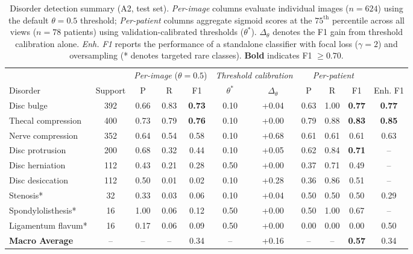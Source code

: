 \documentclass[journal]{IEEEtran}
\begin{document}
\begin{table}[htbp]
\centering
\caption{%
Disorder detection summary (A2, test set). \textit{Per-image} columns evaluate individual images ($n=624$) using the default $\theta=0.5$ threshold; \textit{Per-patient} columns aggregate sigmoid scores at the $75^\text{th}$ percentile across all views ($n=78$ patients) using validation-calibrated thresholds ($\theta^*$). $\Delta_\theta$ denotes the F1 gain from threshold calibration alone. \textit{Enh. F1} reports the performance of a standalone classifier with focal loss ($\gamma=2$) and oversampling (* denotes targeted rare classes). \textbf{Bold} indicates F1 $\geq 0.70$.%
}
\label{tab:disorders}
\begin{tabular*}{\textwidth}{@{\extracolsep{\fill}} l c ccc c c ccc c @{}}
\toprule
& & \multicolumn{3}{c}{\textit{Per-image} ($\theta=0.5$)} 
& \multicolumn{2}{c}{\textit{Threshold calibration}} 
& \multicolumn{3}{c}{\textit{Per-patient}} 
& \\
\cmidrule{3-5} \cmidrule{6-7} \cmidrule{8-10}
Disorder & Support & P & R & F1 & $\theta^*$ & $\Delta_\theta$ & P & R & F1 & Enh. F1 \\
\midrule
Disc bulge & 392 & 0.66 & 0.83 & \textbf{0.73} & 0.10 & +0.04 & 0.63 & 1.00 & \textbf{0.77} & \textbf{0.77} \\
Thecal compression & 400 & 0.73 & 0.79 & \textbf{0.76} & 0.10 & +0.00 & 0.79 & 0.88 & \textbf{0.83} & \textbf{0.85} \\
Nerve compression & 352 & 0.64 & 0.54 & 0.58 & 0.10 & +0.68 & 0.61 & 0.61 & 0.61 & 0.63 \\
Disc protrusion & 200 & 0.68 & 0.32 & 0.44 & 0.10 & +0.05 & 0.62 & 0.84 & \textbf{0.71} & -- \\
Disc herniation & 112 & 0.43 & 0.21 & 0.28 & 0.50 & +0.00 & 0.37 & 0.71 & 0.49 & -- \\
Disc desiccation & 112 & 0.50 & 0.01 & 0.02 & 0.10 & +0.28 & 0.36 & 0.86 & 0.51 & -- \\
Stenosis* & 32 & 0.33 & 0.03 & 0.06 & 0.10 & +0.04 & 0.50 & 0.50 & 0.50 & 0.29 \\
Spondylolisthesis* & 16 & 1.00 & 0.06 & 0.12 & 0.50 & +0.00 & 0.50 & 1.00 & 0.67 & -- \\
Ligamentum flavum* & 16 & 0.17 & 0.06 & 0.09 & 0.50 & +0.00 & 0.00 & 0.00 & 0.00 & 0.50 \\
\midrule
\textbf{Macro Average} & -- & -- & -- & 0.34 & -- & +0.16 & -- & -- & \textbf{0.57} & 0.34 \\
\bottomrule
\end{tabular*}
\end{table}
\end{document}
